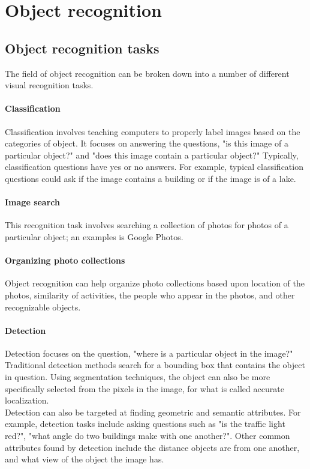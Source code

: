 \documentclass{article}
\begin{document}
\section{Object recognition}

\subsection{Object recognition tasks}
The field of object recognition can be broken down into a number of different visual recognition tasks. 

\paragraph{Classification} 
Classification involves teaching computers to properly label images based on the categories of object. It focuses on answering the questions, "is this image of a particular object?" and "does this image contain a particular object?" Typically, classification questions have yes or no answers. For example, typical classification questions could ask if the image contains a building or if the image is of a lake.

\paragraph{Image search} 
This recognition task involves searching a collection of photos for photos of a particular object; an examples is Google Photos.

\paragraph{Organizing photo collections} 
Object recognition can help organize photo collections based upon location of the photos, similarity of activities, the people who appear in the photos, and other recognizable objects.

\paragraph{Detection}
Detection focuses on the question, "where is a particular object in the image?" Traditional detection methods search for a bounding box that contains the object in question. Using segmentation techniques, the object can also be more specifically selected from the pixels in the image, for what is called accurate localization. \\
Detection can also be targeted at finding geometric and semantic attributes. For example, detection tasks include asking questions such as "is the traffic light red?", "what angle do two buildings make with one another?". Other common attributes found by detection include the distance objects are from one another, and what view of the object the image has.
\end{document}
